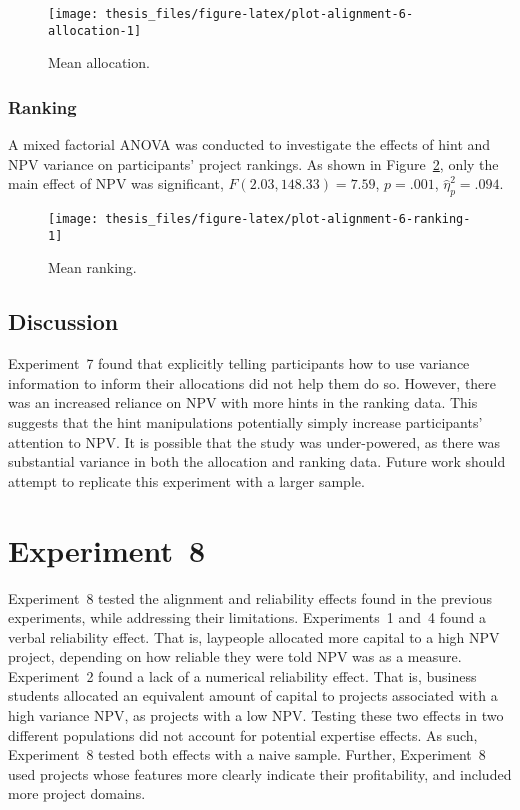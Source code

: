 \documentclass[a4paper, nobind]{templates/ociamthesis}
\theoremstyle{definition}
\theoremstyle{definition}
\theoremstyle{definition}
\theoremstyle{definition}
\theoremstyle{remark}
\begin{document}
\begin{figure}
\texttt{[image: thesis\_files/figure-latex/plot-alignment-6-allocation-1]} \caption{Mean allocation.}\label{fig:plot-alignment-6-allocation}
\end{figure}

\subsubsection{Ranking}

A mixed factorial ANOVA was conducted to investigate the effects of hint and NPV
variance on participants' project rankings. As shown in
Figure~\ref{fig:plot-alignment-6-ranking}, only the main effect of NPV
was significant, \(F(2.03, 148.33) = 7.59\), \(p = .001\), \(\hat{\eta}^2_p = .094\).



\begin{figure}
\texttt{[image: thesis\_files/figure-latex/plot-alignment-6-ranking-1]} \caption{Mean ranking.}\label{fig:plot-alignment-6-ranking}
\end{figure}

\subsection{Discussion}

Experiment~7 found that explicitly telling participants how to use variance
information to inform their allocations did not help them do so. However,
there was an increased reliance on NPV with more hints in the ranking data. This
suggests that the hint manipulations potentially simply increase participants'
attention to NPV. It is possible that the study was under-powered, as there was
substantial variance in both the allocation and ranking data. Future work should
attempt to replicate this experiment with a larger sample.

\hypertarget{alignment-7}{%
\section{Experiment~8}\label{alignment-7}}

Experiment~8 tested the alignment and reliability effects found in the previous
experiments, while addressing their limitations. Experiments~1 and~4 found a
verbal reliability effect. That is, laypeople allocated more capital to a high
NPV project, depending on how reliable they were told NPV was as a measure.
Experiment~2 found a lack of a numerical reliability effect. That is, business
students allocated an equivalent amount of capital to projects associated with a
high variance NPV, as projects with a low NPV. Testing these two effects in two
different populations did not account for potential expertise effects. As such,
Experiment~8 tested both effects with a naive sample. Further, Experiment~8 used
projects whose features more clearly indicate their profitability, and included
more project domains.
\end{document}
